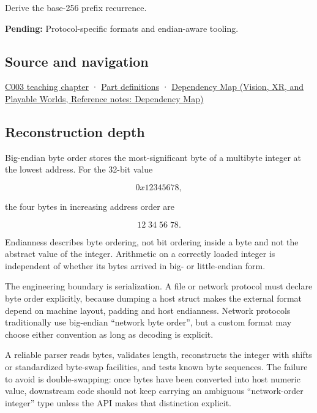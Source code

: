 Derive the base-256 prefix recurrence.

\textbf{Pending:} Protocol-specific formats and endian-aware tooling.

\subsection{Source and navigation}\label{appendix-92e040df969a-source-and-navigation}

\hyperref[01-foundations-i-ch002-where-the-bytes-live]{C003 teaching chapter} · \hyperref[appendix-fd090d982a15-m003---parts-41-60]{Part definitions} · \href{../07-Vision-XR-and-Playable-Worlds/main.pdf\#nameddest=appendix-4ad47bdd269a}{Dependency Map (Vision, XR, and Playable Worlds, Reference notes: Dependency Map)}

\subsection{Reconstruction depth}\label{appendix-92e040df969a-reconstruction-depth}

Big-endian byte order stores the most-significant byte of a multibyte integer at the lowest address. For the 32-bit value

\[
0x12345678,
\]

the four bytes in increasing address order are

\[
12\;34\;56\;78.
\]

Endianness describes byte ordering, not bit ordering inside a byte and not the abstract value of the integer. Arithmetic on a correctly loaded integer is independent of whether its bytes arrived in big- or little-endian form.

The engineering boundary is serialization. A file or network protocol must declare byte order explicitly, because dumping a host struct makes the external format depend on machine layout, padding and host endianness. Network protocols traditionally use big-endian ``network byte order'', but a custom format may choose either convention as long as decoding is explicit.

A reliable parser reads bytes, validates length, reconstructs the integer with shifts or standardized byte-swap facilities, and tests known byte sequences. The failure to avoid is double-swapping: once bytes have been converted into host numeric value, downstream code should not keep carrying an ambiguous ``network-order integer'' type unless the API makes that distinction explicit.
